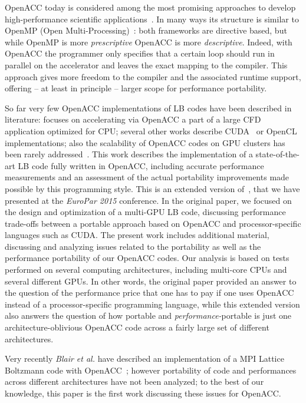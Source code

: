 \documentclass[times]{cpeauth}
\begin{document}
OpenACC today is considered among the most promising approaches to develop 
high-performance scientific applications~\cite{se4hpcs15}. 
In many ways its structure is similar to OpenMP (Open Multi-Processing)~\cite{Wienke2014812}:
%
both frameworks are directive based, but while OpenMP is more {\em prescriptive} 
OpenACC is more {\em descriptive}. 
%
Indeed, with OpenACC the programmer only specifies that a certain loop should 
run in parallel on the accelerator and leaves the exact mapping to the compiler.
%
This approach gives more freedom to the compiler and the associated runtime
support, offering -- at least in principle -- larger scope for performance portability.

So far very few OpenACC implementations of LB codes have been described in
literature: \cite{jiri} focuses on accelerating via OpenACC a part of a large 
CFD application optimized for CPU; several other works describe CUDA~\cite{sbac-pad13} 
or OpenCL~\cite{iccs14} implementations; also the scalability of OpenACC codes on GPU 
clusters has been rarely addressed~\cite{scalable-lbm-cuda}. 
%
This work describes the implementation of a state-of-the-art LB code fully 
written in OpenACC, including accurate performance measurements and an 
assessment of the actual portability improvements made possible by this 
programming style.
%
This is an extended version of~\cite{europar15}, that we have presented 
at the {\em EuroPar 2015} conference.  
%
In the original paper, we focused on the design and optimization of a multi-GPU LB 
code, discussing performance trade-offs between a portable approach based on 
OpenACC and processor-specific languages such as CUDA.
%
The present work includes additional material, discussing and analyzing issues 
related to the portability as well as the performance portability of our OpenACC 
codes. 
%
Our analysis is based on tests performed on several 
computing architectures, including multi-core CPUs and several different GPUs.
%
In other words, the original paper provided an answer to the question of the 
performance price that one has to pay if one uses  OpenACC instead of a 
processor-specific programming language,  while this extended version also 
answers the question of how portable and {\em performance-}portable 
is just one architecture-oblivious OpenACC code across a fairly large set of 
different architectures.

Very recently {\em Blair et al.} have described an implementation of a 
MPI Lattice Boltzmann code with OpenACC~\cite{blair15}; however portability of code and 
performances across different architectures have not been analyzed;  
to the best of our knowledge, this paper is the first work discussing these 
issues for OpenACC.
\end{document}
